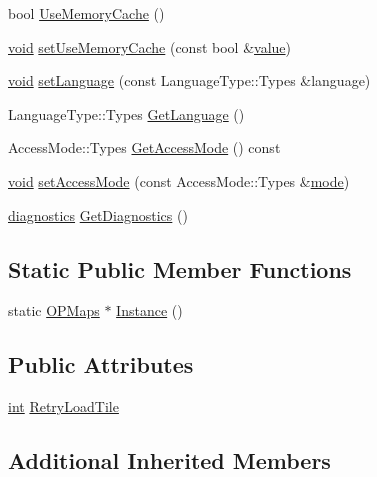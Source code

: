 \begin{DoxyCompactItemize}
bool \hyperlink{group___o_p_map_widget_ga2645fe8a750602f5aaa9258af2d7d63e}{Use\-Memory\-Cache} ()
\item 
\hyperlink{group___u_a_v_objects_plugin_ga444cf2ff3f0ecbe028adce838d373f5c}{void} \hyperlink{group___o_p_map_widget_ga87583d4fb36185a5b8275459e7703246}{set\-Use\-Memory\-Cache} (const bool \&\hyperlink{glext_8h_aa0e2e9cea7f208d28acda0480144beb0}{value})
\item 
\hyperlink{group___u_a_v_objects_plugin_ga444cf2ff3f0ecbe028adce838d373f5c}{void} \hyperlink{group___o_p_map_widget_gae64b24b63987a957d4365fcca6bab5e5}{set\-Language} (const Language\-Type\-::\-Types \&language)
\item 
Language\-Type\-::\-Types \hyperlink{group___o_p_map_widget_gaef0dbfe6f1a4d195b33a070779dffc33}{Get\-Language} ()
\item 
Access\-Mode\-::\-Types \hyperlink{group___o_p_map_widget_ga9903355f0dd5ff46a913e1a02bb059ea}{Get\-Access\-Mode} () const 
\item 
\hyperlink{group___u_a_v_objects_plugin_ga444cf2ff3f0ecbe028adce838d373f5c}{void} \hyperlink{group___o_p_map_widget_ga68cf9ffb0f3ff2362243777dbd773437}{set\-Access\-Mode} (const Access\-Mode\-::\-Types \&\hyperlink{glext_8h_a1e71d9c196e4683cc06c4b54d53f7ef5}{mode})
\item 
\hyperlink{structdiagnostics}{diagnostics} \hyperlink{group___o_p_map_widget_ga4e9750aee8233e707a09efdb60f4c1af}{Get\-Diagnostics} ()
\end{DoxyCompactItemize}
\subsection*{Static Public Member Functions}
\begin{DoxyCompactItemize}
\item 
static \hyperlink{classcore_1_1_o_p_maps}{O\-P\-Maps} $\ast$ \hyperlink{group___o_p_map_widget_ga20822cc13b7089e598c95023a90ed036}{Instance} ()
\end{DoxyCompactItemize}
\subsection*{Public Attributes}
\begin{DoxyCompactItemize}
\item 
\hyperlink{ioapi_8h_a787fa3cf048117ba7123753c1e74fcd6}{int} \hyperlink{group___o_p_map_widget_ga21cb35ff34ca1e5eccfe7a0c8f054933}{Retry\-Load\-Tile}
\end{DoxyCompactItemize}
\subsection*{Additional Inherited Members}


